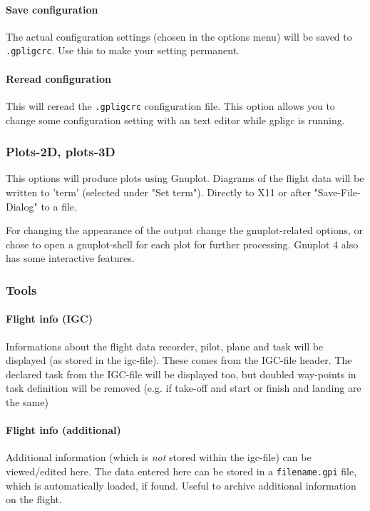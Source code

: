 \paragraph{Save configuration}
The actual configuration settings (chosen in the options menu) will be saved to \texttt{.gpligcrc}.
Use this to make your setting permanent.

\paragraph{Reread configuration}
This will reread the \texttt{.gpligcrc} configuration file.
This option allows you to change some configuration setting with an text editor while gpligc is running.


\subsubsection{Plots-2D, plots-3D}
This options will produce plots using Gnuplot.
Diagrams of the flight data will be written to 'term' (selected under "Set term").
Directly to X11 or after "Save-File-Dialog" to a file.

For changing the appearance of the output change the gnuplot-related options, or chose to open
a gnuplot-shell for each plot for further processing.
Gnuplot 4 also has some interactive features.

\subsubsection{Tools}

\paragraph{Flight info (IGC)}
Informations about the flight data recorder, pilot, plane and task will be displayed (as stored in the igc-file).
These comes from the IGC-file header.
The declared task from the IGC-file will be displayed too, but doubled way-points in task definition will be removed
(e.g. if take-off and start or finish and landing are the same)

\paragraph{Flight info (additional)}
\label{add_info}
Additional information (which is \emph{not} stored within the igc-file) can be viewed/edited here.
The data entered here can be stored in a \texttt{filename.gpi} file, which is automatically loaded, if found.
Useful to archive additional information on the flight.


